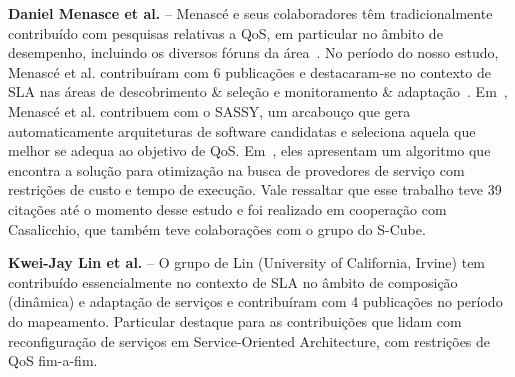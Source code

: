 \textbf{Daniel Menasce et al.} -- Menasc\'{e} e seus colaboradores t\^{e}m tradicionalmente contribu\'{i}do com pesquisas relativas a QoS, em particular no \^{a}mbito de desempenho, incluindo os diversos f\'{o}runs da \'{a}rea~\cite{DBLP:journals/tse/MenasceG00, Menasce:2001:CPW:560806}. No per\'{i}odo do nosso estudo, Menasc\'{e} et al. contribu\'{i}ram com 6 publica\c{c}\~{o}es e destacaram-se no contexto de SLA nas \'{a}reas de descobrimento \& sele\c{c}\~{a}o e monitoramento \& adapta\c{c}\~{a}o~\cite{5696721, DBLP:MenasceCD10, 5552741}. Em~\cite{5696721}, Menasc\'{e} et al. contribuem com o SASSY, um arcabou\c{c}o que gera automaticamente arquiteturas de software candidatas e seleciona aquela que melhor se adequa ao objetivo de QoS. Em~\cite{DBLP:MenasceCD10}, eles apresentam um algoritmo que encontra a solu\c{c}\~{a}o para otimiza\c{c}\~{a}o na busca de provedores de servi\c{c}o com restri\c{c}\~{o}es de custo e tempo de execu\c{c}\~{a}o. Vale ressaltar que esse trabalho teve 39 cita\c{c}\~{o}es at\'{e} o momento desse estudo e foi realizado em coopera\c{c}\~{a}o com Casalicchio, que tamb\'{e}m teve colabora\c{c}\~{o}es com o grupo do S-Cube.  

\textbf{Kwei-Jay Lin et al.} -- O grupo de Lin (University of California, Irvine) tem contribu\'{i}do essencialmente no contexto de SLA no \^{a}mbito de composi\c{c}\~{a}o (din\^{a}mica) e adapta\c{c}\~{a}o de servi\c{c}os e contribu\'{i}ram com 4 publica\c{c}\~{o}es no per\'{i}odo do mapeamento. Particular destaque para  as contribui\c{c}\~{o}es \cite{Lin:2009:EAS:1602932.1603224, Lin:2010:DIS:1861294.1861332, Zhai:2009:SMS:1586636.1586972} que lidam com reconfigura\c{c}\~{a}o de servi\c{c}os em Service-Oriented Architecture, com restri\c{c}\~{o}es de QoS fim-a-fim. 



